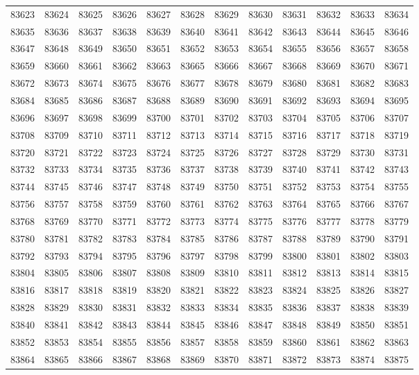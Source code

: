\begin{center}
\begin{longtable}{llllllllllll}
83623 &83624 &83625 &83626 &83627 &83628 &83629 &83630 &83631 &83632 &83633 &83634 \\
83635 &83636 &83637 &83638 &83639 &83640 &83641 &83642 &83643 &83644 &83645 &83646 \\
83647 &83648 &83649 &83650 &83651 &83652 &83653 &83654 &83655 &83656 &83657 &83658 \\
83659 &83660 &83661 &83662 &83663 &83665 &83666 &83667 &83668 &83669 &83670 &83671 \\
83672 &83673 &83674 &83675 &83676 &83677 &83678 &83679 &83680 &83681 &83682 &83683 \\
83684 &83685 &83686 &83687 &83688 &83689 &83690 &83691 &83692 &83693 &83694 &83695 \\
83696 &83697 &83698 &83699 &83700 &83701 &83702 &83703 &83704 &83705 &83706 &83707 \\
83708 &83709 &83710 &83711 &83712 &83713 &83714 &83715 &83716 &83717 &83718 &83719 \\
83720 &83721 &83722 &83723 &83724 &83725 &83726 &83727 &83728 &83729 &83730 &83731 \\
83732 &83733 &83734 &83735 &83736 &83737 &83738 &83739 &83740 &83741 &83742 &83743 \\
83744 &83745 &83746 &83747 &83748 &83749 &83750 &83751 &83752 &83753 &83754 &83755 \\
83756 &83757 &83758 &83759 &83760 &83761 &83762 &83763 &83764 &83765 &83766 &83767 \\
83768 &83769 &83770 &83771 &83772 &83773 &83774 &83775 &83776 &83777 &83778 &83779 \\
83780 &83781 &83782 &83783 &83784 &83785 &83786 &83787 &83788 &83789 &83790 &83791 \\
83792 &83793 &83794 &83795 &83796 &83797 &83798 &83799 &83800 &83801 &83802 &83803 \\
83804 &83805 &83806 &83807 &83808 &83809 &83810 &83811 &83812 &83813 &83814 &83815 \\
83816 &83817 &83818 &83819 &83820 &83821 &83822 &83823 &83824 &83825 &83826 &83827 \\
83828 &83829 &83830 &83831 &83832 &83833 &83834 &83835 &83836 &83837 &83838 &83839 \\
83840 &83841 &83842 &83843 &83844 &83845 &83846 &83847 &83848 &83849 &83850 &83851 \\
83852 &83853 &83854 &83855 &83856 &83857 &83858 &83859 &83860 &83861 &83862 &83863 \\
83864 &83865 &83866 &83867 &83868 &83869 &83870 &83871 &83872 &83873 &83874 &83875 \\

\end{longtable}
\end{center}
